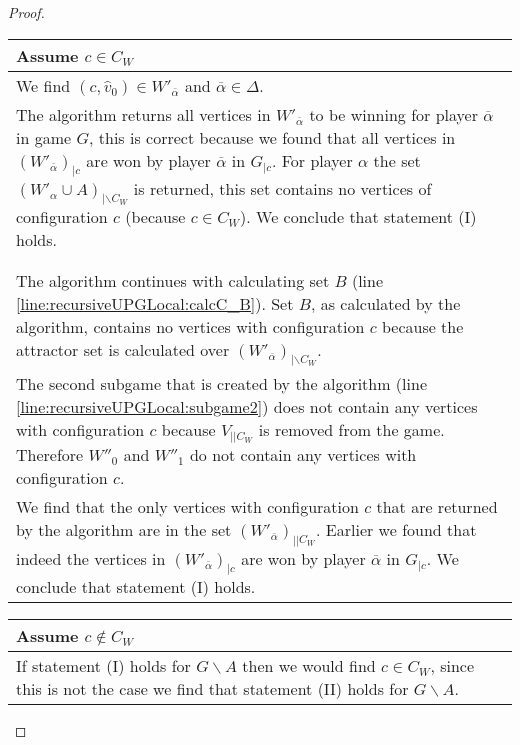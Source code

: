 \begin{theorem}
\begin{proof}
		\begin{longtable}{|p{14.2cm}}
			Assume $c \in C_W$\\
			\hline
			We find $(c,\hat{v}_0) \in W'_{\overline{\alpha}}$ and $\overline{\alpha} \in \Delta$.
			
			\begin{tabular}{|p{14cm}}
				Assume $(W'_{\overline{\alpha}})_{|\backslash C_W} = \emptyset$ (line \ref{line:recursiveUPGLocal:wopponentwithoutCWisempty})\\
				\hline
				The algorithm returns all vertices in $W'_{\overline{\alpha}}$ to be winning for player $\overline{\alpha}$ in game $G$, this is correct because we found that all vertices in $(W'_{\overline{\alpha}})_{|c}$ are won by player $\overline{\alpha}$ in $G_{|c}$. For player $\alpha$ the set $(W'_\alpha \cup A)_{|\backslash C_W}$ is returned, this set contains no vertices of configuration $c$ (because $c \in C_W$). We conclude that statement (I) holds.
			\end{tabular}\\\\
			\begin{tabular}{|p{14cm}}
				Assume $(W'_{\overline{\alpha}})_{|\backslash C_W} \neq \emptyset$ (line \ref{line:recursiveUPGLocal:wopponentwithoutCWisempty})\\
				\hline
				The algorithm continues with calculating set $B$ (line \ref{line:recursiveUPGLocal:calcC_B}). Set $B$, as calculated by the algorithm, contains no vertices with configuration $c$ because the attractor set is calculated over $(W'_{\overline{\alpha}})_{|\backslash C_W}$.\\
				The second subgame that is created by the algorithm (line \ref{line:recursiveUPGLocal:subgame2}) does not contain any vertices with configuration $c$ because $V_{||C_W}$ is removed from the game. Therefore $W''_0$ and $W''_1$ do not contain any vertices with configuration $c$.\\
				We find that the only vertices with configuration $c$ that are returned by the algorithm are in the set $(W'_{\overline{\alpha}})_{||C_W}$. Earlier we found that indeed the vertices in $(W'_{\overline{\alpha}})_{|c}$ are won by player $\overline{\alpha}$ in $G_{|c}$. We conclude that statement (I) holds.
			\end{tabular}
		\end{longtable}
		\begin{longtable}{|p{14.2cm}}
			Assume $c \notin C_W$\\
			\hline
			If statement (I) holds for $G\backslash A$ then we would find $c \in C_W$, since this is not the case we find that statement (II) holds for $G\backslash A$.
			

\end{longtable}
\end{proof}
\end{theorem}

